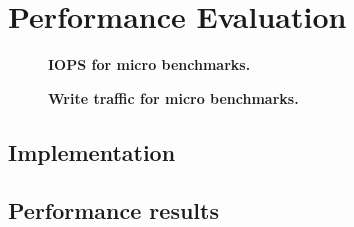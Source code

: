 \section{Performance Evaluation}


\begin{figure*}[t]
    \centering{}
    \caption{\textbf{IOPS for micro benchmarks.}}
\end{figure*}


\begin{figure*}[t]
    \centering{}
    \caption{\textbf{Write traffic for micro benchmarks.}}
    \label{fig_spartan_archi}
\end{figure*}


%
%

\subsection{Implementation}

\subsection{Performance results}
